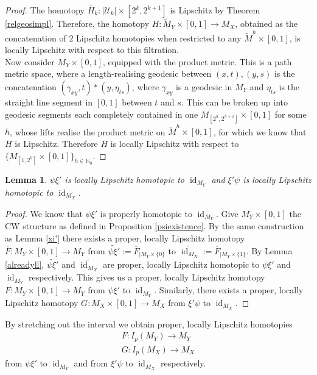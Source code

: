 \documentclass[a4paper,11pt]{article}
\theoremstyle{definition}
\theoremstyle{plain}
\newtheorem{lemma}[definition]{Lemma}
\theoremstyle{remark}
\DeclareMathOperator{\id}{id}
\begin{document}
{\begin{proof}
The homotopy $\overline{H}_{k}: |\mathcal{U}_{k}| \times [2^k, 2^{k+1}]$ is Lipschitz by Theorem \ref{relgeosimpl}. Therefore, the homotopy $H: \tilde{M}_{Y} \times [0,1] \rightarrow M_{X}$, obtained as the concatenation of $2$ Lipschitz homotopies when restricted to any $\tilde{M}^{h} \times [0,1]$, is locally Lipschitz with respect to this filtration.  \\

Now consider $M_{Y} \times [0,1]$, equipped with the product metric. This is a path metric space, where a length-realising geodesic between $(x,t),(y,s)$ is the concatenation $(\gamma_{xy},t)\ast (y,\eta_{ts})$, where $\gamma_{xy}$ is a geodesic in $M_{Y}$ and $\eta_{ts}$ is the straight line segment in $[0,1]$ between $t$ and $s$. This can be broken up into geodesic segments each completely contained in one $M_{[2^{h},2^{h+1}]} \times [0,1]$ for some $h$, whose lifts realise the product metric on  $\tilde{M}^h \times [0,1]$, for which we know that $H$ is Lipschitz. Therefore $H$ is locally Lipschitz with respect to  $\{M_{[1,2^h]} \times [0,1]\}_{h\in \mathbb{N}_{0}}$. 
\end{proof}

\begin{lemma} \label{liphomotopies} $\psi \xi'$ is locally Lipschitz homotopic to $\id_{M_{Y}}$ and $\xi' \psi$ is locally Lipschitz homotopic to $\id_{M_{X}}$.
\end{lemma}

\begin{proof} We know that $\psi \xi'$ is properly homotopic to $\id_{M_{Y}}$. Give $M_{Y} \times [0,1]$ the CW structure as defined in Proposition \ref{psiexistence}. By the same construction as Lemma \ref{xi'} there exists a proper, locally Lipschitz homotopy $\overline{F}: M_{Y} \times [0,1] \rightarrow M_{Y}$ from  $\widetilde{\psi \xi'}:=\overline{F}_{|M_{Y} \times \{0\}}$ to $\widetilde{\id_{M_{X}}}:= \overline{F}_{|M_{Y}\times \{1\}}$. By Lemma \ref{alreadyll}, $\widetilde{\psi \xi'}$ and $\widetilde{\id_{M_{X}}}$ are proper, locally Lipschitz homotopic to $\psi \xi'$ and $\id_{M_{Y}}$ respectively. This gives us a proper, locally Lipschitz homotopy $F: M_{Y} \times [0,1] \rightarrow M_{Y}$ from $\psi \xi'$ to $\id_{M_{Y}}$. Similarly, there exists a proper, locally Lipschitz homotopy $G: M_{X} \times [0,1]\rightarrow M_{X}$ from $\xi' \psi$ to $\id_{M_{X}}$. 
\end{proof}

By stretching out the interval we obtain proper, locally Lipschitz homotopies 
\begin{align*}
F: I_{p}(M_{Y}) \rightarrow M_{Y}\\
G: I_{p}(M_{X})\rightarrow M_{X}
\end{align*}
from $\psi \xi'$ to $\id_{M_{Y}}$ and from $\xi' \psi$ to $\id_{M_{X}}$ respectively. 

}
\end{document}

